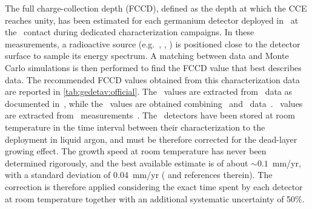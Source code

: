 The full charge-collection depth (FCCD), defined as the depth at which the CCE reaches
unity, has been estimated for each germanium detector deployed in \gerda\ at the \nplus\
contact during dedicated characterization campaigns. In these measurements, a radioactive
source (e.g.~\Am, \Ba, \Co) is positioned close to the detector surface to sample its
energy spectrum. A matching between data and Monte Carlo simulations is then performed to
find the FCCD value that best describes data. The recommended FCCD values obtained from
this characterization data are reported in \cref{tab:gedetav:official}. The \scoax\ values
are extracted from \Co\ data as documented in~\cite{Heider2009}, while the \bege\ values
are obtained combining \Am\ and \Ba\ data~\cite{Agostini2019}. \icoax\ values are
extracted from \Am\ measurements~\cite{Miloradovic2020}. The \bege\ detectors have been stored at room
temperature in the time interval between their characterization to the deployment in
liquid argon, and must be therefore corrected for the dead-layer growing effect. The
growth speed at room temperature has never been determined rigorously, and the best
available estimate is of about $\sim{}0.1$~mm/yr, with a standard deviation of 0.04~mm/yr
(\cite{Agostini2019} and references therein). The correction is therefore applied
considering the exact time spent by each detector at room temperature together with an
additional systematic uncertainty of 50\%.
\begin{table}
  \centering
  \caption{%
    Recommended full charge-collection depth (FCCD) and dead layer fraction (DLF) values
    for each detector deployed in \gerdatwo, calculated from detector characterization
    data. The \bege\ FCCD values are obtained combining \Am\ and \Ba\
    data~\cite{Agostini2019} while \scoax\ values are extracted from \Co\
    data~\cite{Heider2009}. The \icoax\ values are obtained from \Am\
    data~\cite{Miloradovic2020}. The \bege\ FCCDs are corrected for the dead-layer growing
    effect at room temperature experienced before installment in
    \gerda~\cite{Agostini2019}. The \bege\ uncertainties are split into correlated and
    uncorrelated contributions (FCCD$\protect\substack{+\text{corr}\,+\text{ucorr} \\
    -\text{corr}\,-\text{ucorr}}$). The DLF values have been estimated
    in~\cite{Lehnert2016} and do not include any growing effect at room temperature.
  }\label{tab:gedetav:official}
  
\end{table}

